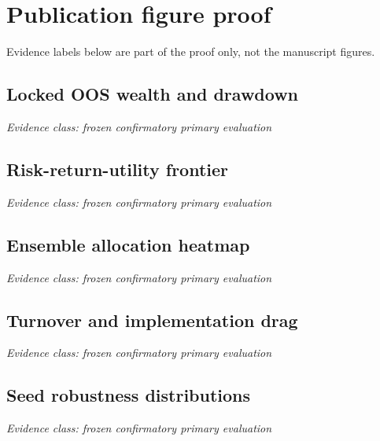\documentclass[11pt,a4paper]{article}
\begin{document}
\section*{Publication figure proof}
Evidence labels below are part of the proof only, not the manuscript figures.
\subsection*{Locked OOS wealth and drawdown}
\noindent\textit{Evidence class: frozen confirmatory primary evaluation}\par\medskip
\begin{center}

\end{center}
\clearpage
\subsection*{Risk-return-utility frontier}
\noindent\textit{Evidence class: frozen confirmatory primary evaluation}\par\medskip
\begin{center}

\end{center}
\clearpage
\subsection*{Ensemble allocation heatmap}
\noindent\textit{Evidence class: frozen confirmatory primary evaluation}\par\medskip
\begin{center}

\end{center}
\clearpage
\subsection*{Turnover and implementation drag}
\noindent\textit{Evidence class: frozen confirmatory primary evaluation}\par\medskip
\begin{center}

\end{center}
\clearpage
\subsection*{Seed robustness distributions}
\noindent\textit{Evidence class: frozen confirmatory primary evaluation}\par\medskip
\begin{center}

\end{center}
\clearpage
\end{document}
